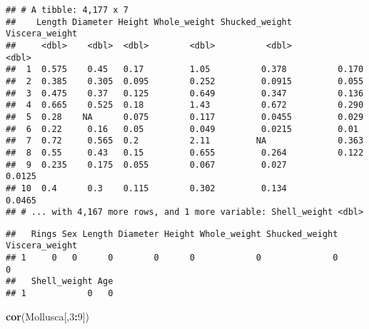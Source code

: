 \documentclass[
]{article}
\newenvironment{Shaded}{\begin{snugshade}}{\end{snugshade}}
\newcommand{\DecValTok}[1]{\textcolor[rgb]{0.00,0.00,0.81}{#1}}
\newcommand{\KeywordTok}[1]{\textcolor[rgb]{0.13,0.29,0.53}{\textbf{#1}}}
\newcommand{\NormalTok}[1]{#1}
\newcommand{\OperatorTok}[1]{\textcolor[rgb]{0.81,0.36,0.00}{\textbf{#1}}}
\newcommand{\StringTok}[1]{\textcolor[rgb]{0.31,0.60,0.02}{#1}}
\begin{document}
\begin{verbatim}
## # A tibble: 4,177 x 7
##    Length Diameter Height Whole_weight Shucked_weight Viscera_weight
##     <dbl>    <dbl>  <dbl>        <dbl>          <dbl>          <dbl>
##  1  0.575    0.45   0.17         1.05          0.378          0.170 
##  2  0.385    0.305  0.095        0.252         0.0915         0.055 
##  3  0.475    0.37   0.125        0.649         0.347          0.136 
##  4  0.665    0.525  0.18         1.43          0.672          0.290 
##  5  0.28    NA      0.075        0.117         0.0455         0.029 
##  6  0.22     0.16   0.05         0.049         0.0215         0.01  
##  7  0.72     0.565  0.2          2.11         NA              0.363 
##  8  0.55     0.43   0.15         0.655         0.264          0.122 
##  9  0.235    0.175  0.055        0.067         0.027          0.0125
## 10  0.4      0.3    0.115        0.302         0.134          0.0465
## # ... with 4,167 more rows, and 1 more variable: Shell_weight <dbl>
\end{verbatim}

\begin{Shaded}
\end{Shaded}

\begin{verbatim}
##   Rings Sex Length Diameter Height Whole_weight Shucked_weight Viscera_weight
## 1     0   0      0        0      0            0              0              0
##   Shell_weight Age
## 1            0   0
\end{verbatim}

\begin{Shaded}
\begin{Highlighting}[]
\KeywordTok{cor}\NormalTok{(Mollusca[,}\DecValTok{3}\OperatorTok{:}\DecValTok{9}\NormalTok{])}
\end{Highlighting}
\end{Shaded}
\end{document}
